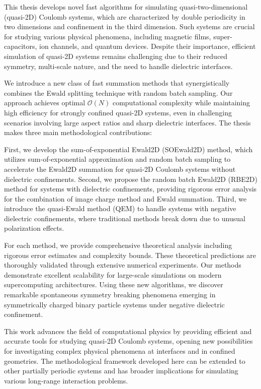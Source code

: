 This thesis develops novel fast algorithms for simulating quasi-two-dimensional (quasi-2D) Coulomb systems, which are characterized by double periodicity in two dimensions and confinement in the third dimension. Such systems are crucial for studying various physical phenomena, including magnetic films, super-capacitors, ion channels, and quantum devices. Despite their importance, efficient simulation of quasi-2D systems remains challenging due to their reduced symmetry, multi-scale nature, and the need to handle dielectric interfaces.

We introduce a new class of fast summation methods that synergistically combines the Ewald splitting technique with random batch sampling. Our approach achieves optimal $\mathcal{O}(N)$ computational complexity while maintaining high efficiency for strongly confined quasi-2D systems, even in challenging scenarios involving large aspect ratios and sharp dielectric interfaces. The thesis makes three main methodological contributions:

First, we develop the sum-of-exponential Ewald2D (SOEwald2D) method, which utilizes sum-of-exponential approximation and random batch sampling to accelerate the Ewald2D summation for quasi-2D Coulomb systems without dielectric confinements. Second, we propose the random batch Ewald2D (RBE2D) method for systems with dielectric confinements, providing rigorous error analysis for the combination of image charge method and Ewald summation. Third, we introduce the quasi-Ewald method (QEM) to handle systems with negative dielectric confinements, where traditional methods break down due to unusual polarization effects.

For each method, we provide comprehensive theoretical analysis including rigorous error estimates and complexity bounds. These theoretical predictions are thoroughly validated through extensive numerical experiments. Our methods demonstrate excellent scalability for large-scale simulations on modern supercomputing architectures. Using these new algorithms, we discover remarkable spontaneous symmetry breaking phenomena emerging in symmetrically charged binary particle systems under negative dielectric confinement.

This work advances the field of computational physics by providing efficient and accurate tools for studying quasi-2D Coulomb systems, opening new possibilities for investigating complex physical phenomena at interfaces and in confined geometries. The methodological framework developed here can be extended to other partially periodic systems and has broader implications for simulating various long-range interaction problems.
